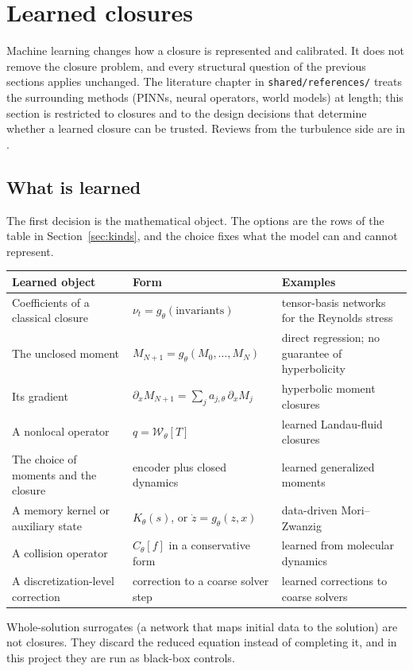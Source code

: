 \section{Learned closures}
\label{sec:learned}

Machine learning changes how a closure is represented and calibrated. It
does not remove the closure problem, and every structural question of the
previous sections applies unchanged. The literature chapter in
\texttt{shared/references/} treats the surrounding methods (PINNs, neural
operators, world models) at length; this section is restricted to closures
and to the design decisions that determine whether a learned closure can be
trusted. Reviews from the turbulence side are in
\cite{DuraisamyIaccarinoXiao19}.

\subsection{What is learned}

The first decision is the mathematical object. The options are the rows of
the table in Section~\ref{sec:kinds}, and the choice fixes what the model
can and cannot represent.
\begin{center}
\renewcommand{\arraystretch}{1.3}
\begin{tabularx}{\textwidth}{@{}P{3.6cm}P{5.2cm}Y@{}}
\toprule
Learned object & Form & Examples \\
\midrule
Coefficients of a classical closure
  & $\nu_t=g_\theta(\text{invariants})$
  & tensor-basis networks for the Reynolds stress \cite{Ling16} \\
The unclosed moment
  & $M_{N+1}=g_\theta(M_0,\dots,M_N)$
  & direct regression; no guarantee of hyperbolicity \\
Its gradient
  & $\partial_xM_{N+1}=\sum_ja_{j,\theta}\,\partial_xM_j$
  & hyperbolic moment closures \cite{Huang21,Christlieb25} \\
A nonlocal operator
  & $q=\mathcal W_\theta[T]$
  & learned Landau-fluid closures \cite{Ma20} \\
The choice of moments and the closure
  & encoder plus closed dynamics
  & learned generalized moments \cite{HanMaMaE19} \\
A memory kernel or auxiliary state
  & $K_\theta(s)$, or $\dot z=g_\theta(z,x)$
  & data-driven Mori--Zwanzig \cite{Lin21} \\
A collision operator
  & $C_\theta[f]$ in a conservative form
  & learned from molecular dynamics \cite{Zhao25} \\
A discretization-level correction
  & correction to a coarse solver step
  & learned corrections to coarse solvers \cite{Kochkov21} \\
\bottomrule
\end{tabularx}
\end{center}
Whole-solution surrogates (a network that maps initial data to the solution)
are not closures. They discard the reduced equation instead of completing
it, and in this project they are run as black-box controls.

